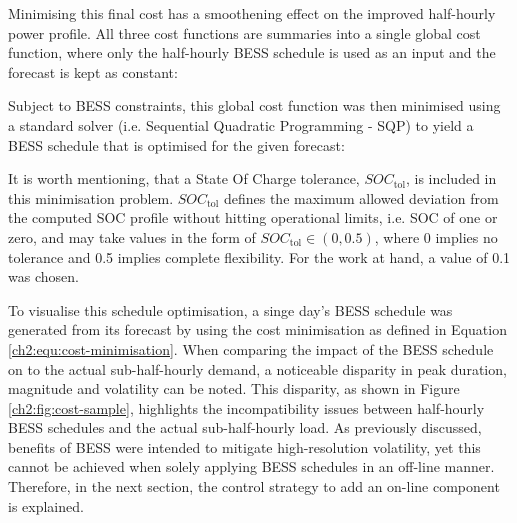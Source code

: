Minimising this final cost has a smoothening effect on the improved half-hourly power profile.
All three cost functions are summaries into a single global cost function, where only the half-hourly BESS schedule is used as an input and the forecast is kept as constant:



Subject to BESS constraints, this global cost function was then minimised using a standard solver (i.e. Sequential Quadratic Programming - SQP) to yield a BESS schedule that is optimised for the given forecast:



It is worth mentioning, that a State Of Charge tolerance, $SOC_\text{tol}$, is included in this minimisation problem.
$SOC_\text{tol}$ defines the maximum allowed deviation from the computed SOC profile without hitting operational limits, i.e. SOC of one or zero, and may take values in the form of $SOC_\text{tol} \in (0, 0.5)$, where 0 implies no tolerance and 0.5 implies complete flexibility.
For the work at hand, a value of 0.1 was chosen.



To visualise this schedule optimisation, a singe day's BESS schedule was generated from its forecast by using the cost minimisation as defined in Equation \ref{ch2:equ:cost-minimisation}.
When comparing the impact of the BESS schedule on to the actual sub-half-hourly demand, a noticeable disparity in peak duration, magnitude and volatility can be noted.
This disparity, as shown in Figure \ref{ch2:fig:cost-sample}, highlights the incompatibility issues between half-hourly BESS schedules and the actual sub-half-hourly load.
As previously discussed, benefits of BESS were intended to mitigate high-resolution volatility, yet this cannot be achieved when solely applying BESS schedules in an off-line manner.
Therefore, in the next section, the control strategy to add an on-line component is explained.




 